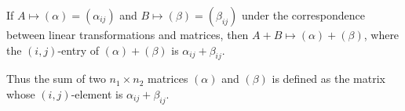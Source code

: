 If $A \mapsto (\alpha) = (\alpha_{ij})$ and $B \mapsto (\beta) = (\beta_{ij})$ under the correspondence between linear transformations and matrices, then $A + B \mapsto (\alpha) + (\beta)$, where the $(i,j)$-entry of $(\alpha) + (\beta)$ is $\alpha_{ij} + \beta_{ij}$.

Thus the sum of two $n_1 \times n_2$ matrices $(\alpha)$ and $(\beta)$ is defined as the matrix whose $(i,j)$-element is $\alpha_{ij} + \beta_{ij}$.
